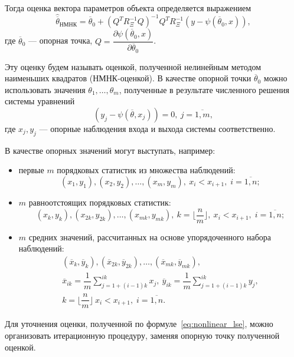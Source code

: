 Тогда оценка вектора параметров объекта определяется выражением~\cite{mukha_2009}
\begin{equation}
  \label{eq:nonlinear_lse}
  \hat{\overline{\theta}}_{\text{НМНК}} =
  \overline{\theta}_0 + (Q^T R^{-1}_{\Xi} Q)^{-1} Q^T R^{-1}_{\Xi} (y - \psi(\overline{\theta}_0, x)),
\end{equation}
где \( \overline{\theta}_0 \) --- опорная точка,
\( Q = \dfrac{\partial \psi(\overline{\theta}_0, x) }{ \partial \overline{\theta}_0 } \).

Эту оценку будем называть оценкой, полученной нелинейным
методом наименьших квадратов (НМНК-оценкой).
В качестве опорной точки \( \overline{\theta}_0 \) можно использовать значения
\( \theta_1, \dotsc, \theta_m \),
полученные в результате численного решения системы уравнений
\begin{equation}
  \label{eq:nonlinear_basic}
  (y_j - \psi( \overline{\theta}, x_j )) = 0, \: j = \overline{1,m},
\end{equation}
где \( x_j, y_j \) --- опорные наблюдения входа и выхода системы соответственно.

В качестве опорных значений могут выступать, например:
\begin{itemize}
\item первые \( m \) порядковых статистик из множества наблюдений:
  \[
    (x_1, y_1), (x_2, y_2), \dotsc , (x_m, y_m), \:
    x_i < x_{i+1}, \;
    i = \overline{1, n};
  \]
\item \( m \) равноотстоящих порядковых статистик:
  \[
    (x_{k}, y_{k}), (x_{2k}, y_{2k}) , \dotsc , (x_{mk}, y_{mk}), \:
    k = \lfloor \dfrac{n}{m} \rfloor, \:
    x_i < x_{i+1}, \;
    i = \overline{1, n};
  \]
\item \( m \) средних значений, рассчитанных на основе
  упорядоченного набора наблюдений:
  \begin{gather}
    ( \overline{x}_{k}, \overline{y}_{k} ),
    ( \overline{x}_{2k}, \overline{y}_{2k} ),
    \dotsc ,
    ( \overline{x}_{mk}, \overline{y}_{mk}), \\
    \overline{x}_{ik} = \dfrac{1}{m} \sum_{j = 1+(i-1)k}^{ik} x_j, \:
    \overline{y}_{ik} = \dfrac{1}{m} \sum_{j = 1+(i-1)k}^{ik} y_j, \\
    k = \lfloor \dfrac{n}{m} \rfloor \:
    x_i < x_{i+1}, \; i = \overline{1, n}.
    \label{eq:nonlinear_base_values}
  \end{gather}
\end{itemize}

Для уточнения оценки, полученной по формуле~\eqref{eq:nonlinear_lse}, можно
организовать итерационную процедуру, заменяя опорную точку полученной оценкой.

